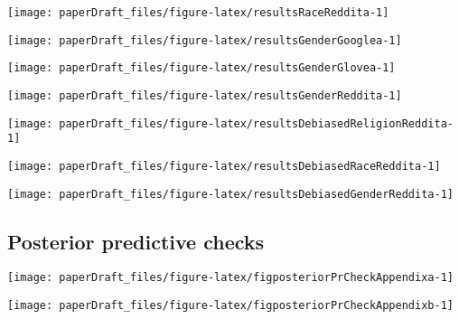 \documentclass[
  12pt,
  dvipsnames,enabledeprecatedfontcommands]{scrartcl}
\begin{document}
\begin{center}\texttt{[image: paperDraft\_files/figure-latex/resultsRaceReddita-1]} \end{center}

\begin{center}\texttt{[image: paperDraft\_files/figure-latex/resultsGenderGooglea-1]} \end{center}

\begin{center}\texttt{[image: paperDraft\_files/figure-latex/resultsGenderGlovea-1]} \end{center}

\begin{center}\texttt{[image: paperDraft\_files/figure-latex/resultsGenderReddita-1]} \end{center}

\begin{center}\texttt{[image: paperDraft\_files/figure-latex/resultsDebiasedReligionReddita-1]} \end{center}

\begin{center}\texttt{[image: paperDraft\_files/figure-latex/resultsDebiasedRaceReddita-1]} \end{center}

\begin{center}\texttt{[image: paperDraft\_files/figure-latex/resultsDebiasedGenderReddita-1]} \end{center}

\hypertarget{posterior-predictive-checks}{%
\subsection{Posterior predictive
checks}\label{posterior-predictive-checks}}

\label{appendix:posterior}

\begin{center}\texttt{[image: paperDraft\_files/figure-latex/figposteriorPrCheckAppendixa-1]} \end{center}

\begin{center}\texttt{[image: paperDraft\_files/figure-latex/figposteriorPrCheckAppendixb-1]} \end{center}
\end{document}
